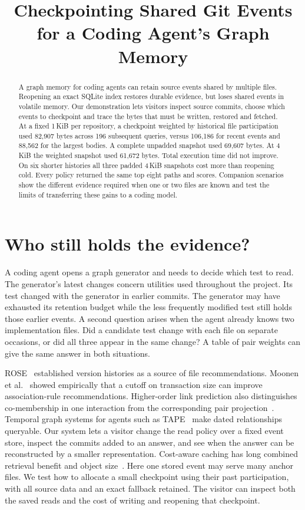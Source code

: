 \documentclass[conference]{IEEEtran}
\title{Checkpointing Shared Git Events for a Coding Agent's Graph Memory}
\author{\IEEEauthorblockN{Anonymous working draft}}
\begin{document}
\maketitle
\begin{abstract}
A graph memory for coding agents can retain source events shared by multiple files. Reopening an exact SQLite index restores durable evidence, but loses shared events in volatile memory. Our demonstration lets visitors inspect source commits, choose which events to checkpoint and trace the bytes that must be written, restored and fetched. At a fixed 1\,KiB per repository, a checkpoint weighted by historical file participation used 82,907 bytes across 196 subsequent queries, versus 106,186 for recent events and 88,562 for the largest bodies. A complete unpadded snapshot used 69,607 bytes. At 4\,KiB the weighted snapshot used 61,672 bytes. Total execution time did not improve. On six shorter histories all three padded 4\,KiB snapshots cost more than reopening cold. Every policy returned the same top eight paths and scores. Companion scenarios show the different evidence required when one or two files are known and test the limits of transferring these gains to a coding model.

\end{abstract}

\section{Who still holds the evidence?}
A coding agent opens a graph generator and needs to decide which test to read. The generator's latest changes concern utilities used throughout the project. Its test changed with the generator in earlier commits. The generator may have exhausted its retention budget while the less frequently modified test still holds those earlier events. A second question arises when the agent already knows two implementation files. Did a candidate test change with each file on separate occasions, or did all three appear in the same change? A table of pair weights can give the same answer in both situations.

ROSE~\cite{zimmermann} established version histories as a source of file recommendations. Moonen et al.~\cite{moonen} showed empirically that a cutoff on transaction size can improve association-rule recommendations. Higher-order link prediction also distinguishes co-membership in one interaction from the corresponding pair projection~\cite{benson}. Temporal graph systems for agents such as TAPE~\cite{tape} make dated relationships queryable. Our system lets a visitor change the read policy over a fixed event store, inspect the commits added to an answer, and see when the answer can be reconstructed by a smaller representation. Cost-aware caching has long combined retrieval benefit and object size~\cite{cao}. Here one stored event may serve many anchor files. We test how to allocate a small checkpoint using their past participation, with all source data and an exact fallback retained. The visitor can inspect both the saved reads and the cost of writing and reopening that checkpoint.
\end{document}
